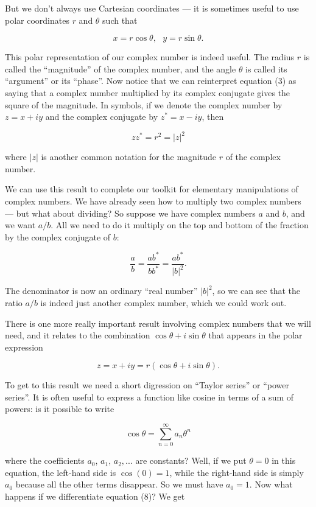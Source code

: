   But we don't always use Cartesian coordinates --- it is sometimes useful to 
  use polar coordinates $r$ and $\theta$ such that 

  $$x=r \cos \theta, \mathrm{~~~} y=r \sin \theta. \tag{4}$$ 

  This polar representation of our complex number is indeed useful. The radius 
  $r$ is called the ``magnitude'' of the complex number, and the angle $\theta$ 
  is called its ``argument'' or its ``phase''. Now notice that we can 
  reinterpret equation (3) as saying that a complex number multiplied by its 
  complex conjugate gives the square of the magnitude. In symbols, if we denote 
  the complex number by $z=x+iy$ and the complex conjugate by $z^*=x-iy$, then 

  $$z z^* =r^2 =|z|^2 \tag{5}$$ 

  where $|z|$ is another common notation for the magnitude $r$ of the complex 
  number. 

  We can use this result to complete our toolkit for elementary manipulations 
  of complex numbers. We have already seen how to multiply two complex numbers 
  --- but what about dividing? So suppose we have complex numbers $a$ and $b$, 
  and we want $a/b$. All we need to do it multiply on the top and bottom of the 
  fraction by the complex conjugate of $b$: 

  $$\dfrac{a}{b}=\dfrac{a b^*}{b b^*}=\dfrac{a b^*}{|b|^2}. \tag{6}$$ 

  The denominator is now an ordinary ``real number'' $|b|^2$, so we can see 
  that the ratio $a/b$ is indeed just another complex number, which we could 
  work out. 

  There is one more really important result involving complex numbers that we 
  will need, and it relates to the combination $\cos \theta + i \sin \theta$ 
  that appears in the polar expression 

  $$z=x+iy=r(\cos \theta +i \sin \theta) . \tag{7}$$ 

  To get to this result we need a short digression on ``Taylor series'' or 
  ``power series''. It is often useful to express a function like cosine in 
  terms of a sum of powers: is it possible to write 

  $$\cos \theta =\sum_{n=0}^\infty{a_n \theta^n} \tag{8}$$ 

  where the coefficients $a_0$, $a_1$, $a_2,...$ are constants? Well, if we put 
  $\theta =0$ in this equation, the left-hand side is $\cos(0)=1$, while the 
  right-hand side is simply $a_0$ because all the other terms disappear. So we 
  must have $a_0=1$. Now what happens if we differentiate equation (8)? We get 

